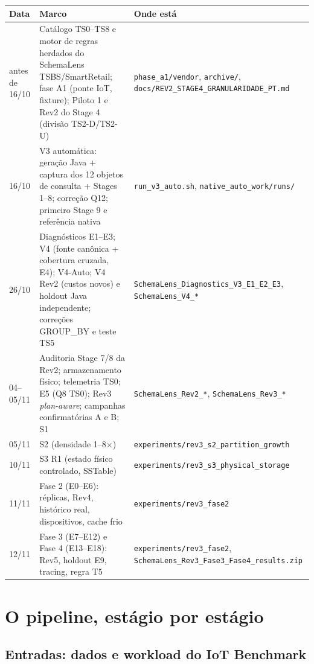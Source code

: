\documentclass[11pt,a4paper]{article}
\begin{document}
\begin{longtable}{@{}p{1.6cm}p{6.3cm}p{6.6cm}@{}}
\toprule
\textbf{Data} & \textbf{Marco} & \textbf{Onde está} \\ \midrule
\endhead
antes de 16/10 & Catálogo TS0--TS8 e motor de regras herdados do SchemaLens TSBS/SmartRetail; fase A1 (ponte IoT, fixture); Piloto 1 e Rev2 do Stage 4 (divisão TS2-D/TS2-U) & \texttt{phase\_a1/vendor}, \texttt{archive/}, \texttt{docs/REV2\_STAGE4\_GRANULARIDADE\_PT.md} \\
16/10 & V3 automática: geração Java + captura dos 12 objetos de consulta + Stages 1--8; correção Q12; primeiro Stage 9 e referência nativa & \texttt{run\_v3\_auto.sh}, \texttt{native\_auto\_work/runs/} \\
26/10 & Diagnósticos E1--E3; V4 (fonte canônica + cobertura cruzada, E4); V4-Auto; V4 Rev2 (custos novos) e holdout Java independente; correções GROUP\_BY e teste TS5 & \texttt{SchemaLens\_Diagnostics\_V3\_E1\_E2\_E3}, \texttt{SchemaLens\_V4\_*} \\
04--05/11 & Auditoria Stage 7/8 da Rev2; armazenamento físico; telemetria TS0; E5 (Q8 TS0); Rev3 \emph{plan-aware}; campanhas confirmatórias A e B; S1 & \texttt{SchemaLens\_Rev2\_*}, \texttt{SchemaLens\_Rev3\_*} \\
05/11 & S2 (densidade 1--8$\times$) & \texttt{experiments/rev3\_s2\_partition\_growth} \\
10/11 & S3 R1 (estado físico controlado, SSTable) & \texttt{experiments/rev3\_s3\_physical\_storage} \\
11/11 & Fase 2 (E0--E6): réplicas, Rev4, histórico real, dispositivos, cache frio & \texttt{experiments/rev3\_fase2} \\
12/11 & Fase 3 (E7--E12) e Fase 4 (E13--E18): Rev5, holdout E9, tracing, regra T5 & \texttt{experiments/rev3\_fase2}, \texttt{SchemaLens\_Rev3\_Fase3\_Fase4\_results.zip} \\
\bottomrule
\end{longtable}

\section{O pipeline, estágio por estágio}

\subsection{Entradas: dados e workload do IoT Benchmark}
\end{document}

